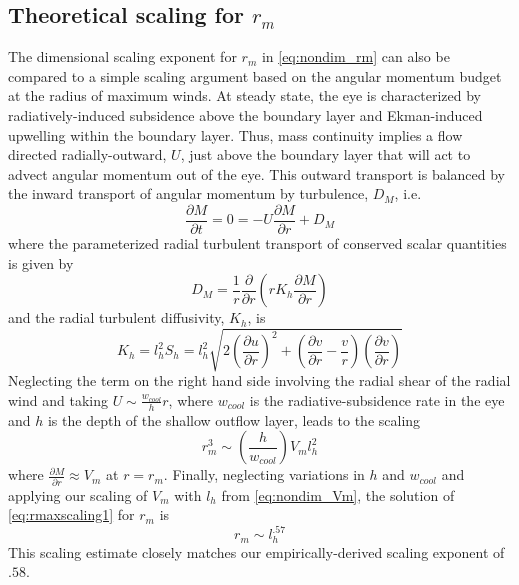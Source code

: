 \documentclass[12pt]{article}
\begin{document}
\subsection{Theoretical scaling for $r_m$}
The dimensional scaling exponent for $r_m$ in \eqref{eq:nondim_rm} can also be compared to a simple scaling argument based on the angular momentum budget at the radius of maximum winds.  At steady state, the eye is characterized by radiatively-induced subsidence above the boundary layer and Ekman-induced upwelling within the boundary layer. Thus, mass continuity implies a flow directed radially-outward, $U$, just above the boundary layer that will act to advect angular momentum out of the eye.  This outward transport is balanced by the inward transport of angular momentum by turbulence, $D_M$, i.e.
\begin{equation}
\label{eq:angmombaleye}
\frac{\partial M}{\partial t} = 0 = -U\frac{\partial M}{\partial r} + D_M
\end{equation}
where the parameterized radial turbulent transport of conserved scalar quantities is given by
\begin{equation}
\label{eq:turbterm}
D_M = \frac{1}{r}\frac{\partial}{\partial r}\left(r K_h \frac{\partial M}{\partial r}\right)
\end{equation}
and the radial turbulent diffusivity, $K_h$, is
\begin{equation}
\label{eq:diffusivity}
K_h = l_h^2 S_h = l_h^2 \sqrt{2\left(\frac{\partial u}{\partial r}\right)^2 + \left(\frac{\partial v}{\partial r}-\frac{v}{r}\right)\left(\frac{\partial v}{\partial r}\right)}
\end{equation}
Neglecting the term on the right hand side involving the radial shear of the radial wind and taking $U \sim \frac{w_{cool}}{h}r$, where $w_{cool}$ is the radiative-subsidence rate in the eye and $h$ is the depth of the shallow outflow layer, leads to the scaling
\begin{equation}
\label{eq:rmaxscaling1}
r_m^3 \sim \left(\frac{h}{w_{cool}}\right)V_ml_h^2
\end{equation}
where $\frac{\partial M}{\partial r} \approx V_m$ at $r=r_m$.
Finally, neglecting variations in $h$ and $w_{cool}$ and applying our scaling of $V_m$ with $l_h$ from \eqref{eq:nondim_Vm}, the solution of \eqref{eq:rmaxscaling1} for $r_m$ is
\begin{equation}
\label{eq:rmaxscaling2}
r_m \sim l_h^{.57}
\end{equation}
This scaling estimate closely matches our empirically-derived scaling exponent of $.58$.
\end{document}
